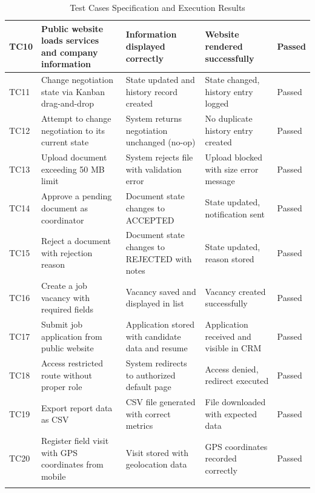 \documentclass[letterpaper%
, oneside%
, 12pt%
, memoireprojet%
, english%
,creativecommons,hyperref, withAlgo2e %
]{thETS}
\begin{document}
\begin{longtable}{|p{1.0cm}|p{4.8cm}|p{3.3cm}|p{2.8cm}|p{1.3cm}|}
TC10 & Public website loads services and company information & Information displayed correctly & Website rendered successfully & Passed \\ \hline

TC11 & Change negotiation state via Kanban drag-and-drop & State updated and history record created & State changed, history entry logged & Passed \\ \hline

TC12 & Attempt to change negotiation to its current state & System returns negotiation unchanged (no-op) & No duplicate history entry created & Passed \\ \hline

TC13 & Upload document exceeding 50 MB limit & System rejects file with validation error & Upload blocked with size error message & Passed \\ \hline

TC14 & Approve a pending document as coordinator & Document state changes to ACCEPTED & State updated, notification sent & Passed \\ \hline

TC15 & Reject a document with rejection reason & Document state changes to REJECTED with notes & State updated, reason stored & Passed \\ \hline

TC16 & Create a job vacancy with required fields & Vacancy saved and displayed in list & Vacancy created successfully & Passed \\ \hline

TC17 & Submit job application from public website & Application stored with candidate data and resume & Application received and visible in CRM & Passed \\ \hline

TC18 & Access restricted route without proper role & System redirects to authorized default page & Access denied, redirect executed & Passed \\ \hline

TC19 & Export report data as CSV & CSV file generated with correct metrics & File downloaded with expected data & Passed \\ \hline

TC20 & Register field visit with GPS coordinates from mobile & Visit stored with geolocation data & GPS coordinates recorded correctly & Passed \\ \hline

\caption{Test Cases Specification and Execution Results}
\label{tab:test_cases}
\end{longtable}
\endgroup
\end{document}
